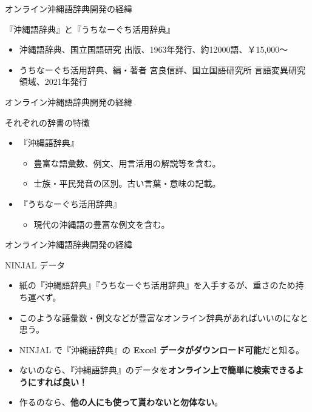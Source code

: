 \documentclass[14pt]{beamer}
\begin{document}


\begin{frame}{オンライン沖縄語辞典開発の経緯}
  \begin{block}{『沖縄語辞典』と『うちなーぐち活用辞典』}
    \begin{itemize}
    \item 沖縄語辞典、国立国語研究 出版、1963年発行、約12000語、￥15,000〜
    \item うちなーぐち活用辞典、編・著者 宮良信詳、国立国語研究所 言語変異研究領域、2021年発行
    \end{itemize}
  \end{block}
\end{frame}

\begin{frame}{オンライン沖縄語辞典開発の経緯}
  \begin{block}{それぞれの辞書の特徴}
    \begin{itemize}
    \item 『沖縄語辞典』
      \begin{itemize}
      \item 豊富な語彙数、例文、用言活用の解説等を含む。
      \item 士族・平民発音の区別。古い言葉・意味の記載。
      \end{itemize}
    \item 『うちなーぐち活用辞典』
      \begin{itemize}
      \item 現代の沖縄語の豊富な例文を含む。
      \end{itemize}
    \end{itemize}
  \end{block}  
\end{frame}


\begin{frame}{オンライン沖縄語辞典開発の経緯}
  \begin{block}{NINJAL データ}
    \begin{itemize}
    \item 紙の『沖縄語辞典』『うちなーぐち活用辞典』を入手するが、重さのため持ち運べず。
    \item このような語彙数・例文などが豊富なオンライン辞典があればいいのになと思う。
    \item NINJAL で『沖縄語辞典』の \textbf{Excel データがダウンロード可能}だと知る。
    \item ないのなら、『沖縄語辞典』のデータを\textbf{オンライン上で簡単に検索できるようにすれば良い！}
    \item 作るのなら、\textbf{他の人にも使って貰わないと勿体ない}。      
    \end{itemize}
  \end{block}
\end{frame}
\end{document}
